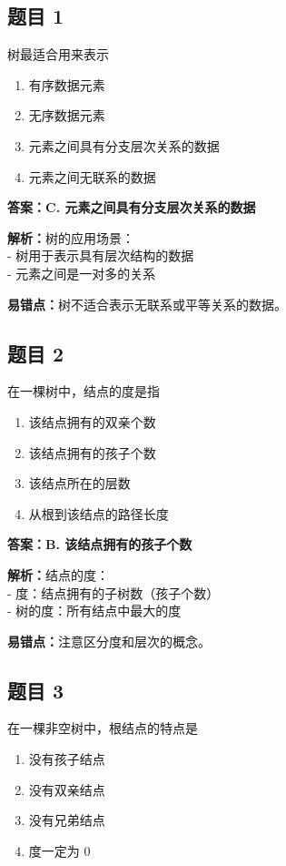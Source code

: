 \documentclass[12pt,a4paper]{ctexart}
\begin{document}
\subsection*{题目 1}
树最适合用来表示
\begin{enumerate}[label=\Alph*.]
	\item 有序数据元素
	\item 无序数据元素
	\item 元素之间具有分支层次关系的数据
	\item 元素之间无联系的数据
\end{enumerate}

\begin{answerbox}
	\textbf{答案：C. 元素之间具有分支层次关系的数据}

	\textbf{解析：}树的应用场景：\\
	- 树用于表示具有层次结构的数据\\
	- 元素之间是一对多的关系

	\textbf{易错点：}树不适合表示无联系或平等关系的数据。
\end{answerbox}

\subsection*{题目 2}
在一棵树中，结点的度是指
\begin{enumerate}[label=\Alph*.]
	\item 该结点拥有的双亲个数
	\item 该结点拥有的孩子个数
	\item 该结点所在的层数
	\item 从根到该结点的路径长度
\end{enumerate}

\begin{answerbox}
	\textbf{答案：B. 该结点拥有的孩子个数}

	\textbf{解析：}结点的度：\\
	- 度：结点拥有的子树数（孩子个数）\\
	- 树的度：所有结点中最大的度

	\textbf{易错点：}注意区分度和层次的概念。
\end{answerbox}

\subsection*{题目 3}
在一棵非空树中，根结点的特点是
\begin{enumerate}[label=\Alph*.]
	\item 没有孩子结点
	\item 没有双亲结点
	\item 没有兄弟结点
	\item 度一定为 0
\end{enumerate}
\end{document}
